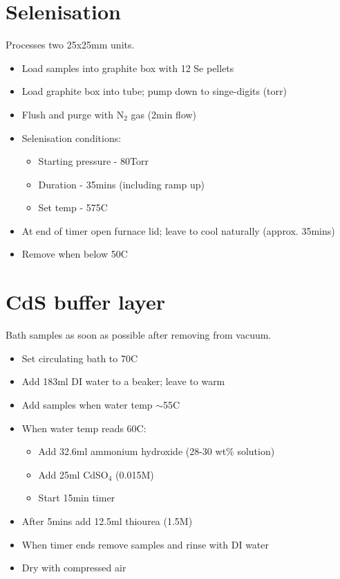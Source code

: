 \documentclass{article}
\begin{document}
\section{Selenisation}
Processes two 25x25mm units.
\begin{itemize}
    \item Load samples into graphite box with 12 Se pellets
    \item Load graphite box into tube; pump down to singe-digits (torr)
    \item Flush and purge with N$_2$ gas (2min flow)
    \item Selenisation conditions:
    \begin{itemize}
        \item Starting pressure - 80Torr
        \item Duration - 35mins (including ramp up)
        \item Set temp - 575\degree C
    \end{itemize}
    \item At end of timer open furnace lid; leave to cool naturally (approx. 35mins)
    \item Remove when below 50\degree C
\end{itemize}

\newpage
\section{CdS buffer layer}
Bath samples as soon as possible after removing from vacuum.
\begin{itemize}
    \item Set circulating bath to 70\degree C
    \item Add 183ml DI water to a beaker; leave to warm
    \item Add samples when water temp $\sim$55\degree C
    \item When water temp reads 60\degree C:
    \begin{itemize}
        \item Add 32.6ml ammonium hydroxide (28-30 wt\% solution)
        \item Add 25ml CdSO$_4$ (0.015M)
        \item Start 15min timer
    \end{itemize}
    \item After 5mins add 12.5ml thiourea (1.5M)
    \item When timer ends remove samples and rinse with DI water
    \item Dry with compressed air
\end{itemize}
\end{document}

